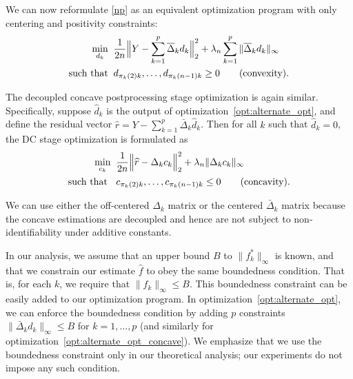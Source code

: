 We can now reformulate \eqref{np} as an equivalent optimization program with only centering and positivity constraints:
\begin{align}
\min_{d_k}\;\; & \frac{1}{2n} 
       \Bigl\| Y - \sum_{k=1}^p 
              \overline{\Delta}_k d_k \Bigr\|_2^2 
               + \lambda_n \sum_{k=1}^p \|\overline{\Delta}_k d_k \|_\infty   
     \label{opt:alternate_opt} \\
\textrm{such that}\;\;  & d_{\pi_k(2)k}, \ldots , d_{\pi_k(n-1)k} \geq 0  	
               \qquad \textrm{(convexity).} \nonumber 
\end{align}

The decoupled concave postprocessing stage optimization is again
similar. Specifically, suppose $\hat{d}_k$ is the output of
optimization~\eqref{opt:alternate_opt}, and define the residual vector
$\hat{r} = Y -
\sum_{k=1}^p \bar{\Delta}_k \hat{d}_k$.  Then 
for all $k$ such that $\hat{d}_k = 0$, the DC stage optimization is
formulated as
\begin{align}
  \min_{c_k}\;\; & 
      \frac{1}{2n} \Bigl \| \widehat{r} - \Delta_k c_k \Bigr \|_2^2
      + \lambda_n \| \Delta_k c_k \|_\infty 
      \label{opt:alternate_opt_concave}\\
 \textrm{such that }\;\; & c_{\pi_k(2)k}, \ldots, c_{\pi_k(n-1)k} \leq 0 \qquad \textrm{(concavity).} \nonumber
\end{align}

We can use either the off-centered $\Delta_k$ matrix or the centered
$\bar{\Delta}_k$ matrix because the concave estimations are decoupled
and hence are not subject to non-identifiability under additive constants.

\begin{remark}
  In our analysis, we assume that an upper bound $B$ to
  $\| f^*_k \|_\infty$ is known, and that we constrain our estimate
  $\hat{f}$ to obey the same boundedness condition.  That is, for each
  $k$, we require that $\|\hat{f}_k\|_\infty \leq B$. This boundedness
  constraint can be easily added to our optimization program. In
  optimization~\eqref{opt:alternate_opt}, we can enforce the boundedness
  condition by adding $p$ constraints $\| \bar{\Delta}_k d_k
  \|_\infty \leq B$ for $k=1,\ldots,p$ (and similarly for
  optimization~\eqref{opt:alternate_opt_concave}). We emphasize that we
  use the boundedness constraint only in our theoretical analysis; 
  our experiments do not impose any such condition.
\end{remark}



